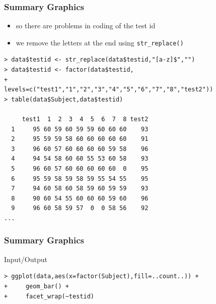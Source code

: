 \documentclass[xcolor={table},c]{beamer}
\begin{document}
\begin{frame}[fragile]\frametitle{Summary Graphics}
  \begin{itemize}
  \item so there are problems in coding of the test id
  \item we remove the letters at the end using \texttt{str\_replace()}
  \end{itemize}\footnotesize
\begin{verbatim}
> data$testid <- str_replace(data$testid,"[a-z]$","")
> data$testid <- factor(data$testid,
+                       levels=c("test1","1","2","3","4","5","6","7","8","test2"))
> table(data$Subject,data$testid)
    
     test1  1  2  3  4  5  6  7  8 test2
  1     95 60 59 60 59 59 60 60 60    93
  2     95 59 59 58 60 60 60 60 60    91
  3     96 60 57 60 60 60 60 59 58    96
  4     94 54 58 60 60 55 53 60 58    93
  5     96 60 57 60 60 60 60 60  0    95
  6     95 59 58 59 58 59 55 54 55    95
  7     94 60 58 60 58 59 60 59 59    93
  8     90 60 54 55 60 60 60 59 60    96
  9     96 60 58 59 57  0  0 58 56    92
...
\end{verbatim}
\end{frame}


\begin{frame}[fragile]\frametitle{Summary Graphics}
\begin{exampleblock}{Input/Output}\tiny
\begin{verbatim}
> ggplot(data,aes(x=factor(Subject),fill=..count..)) +
+     geom_bar() +
+     facet_wrap(~testid)
\end{verbatim}
    \end{exampleblock}
\begin{center}
\end{center}
\end{frame}
\end{document}
